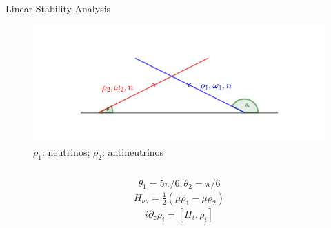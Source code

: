 \begin{frame}{Linear Stability Analysis}

   \vspace{-1em}
   \begin{figure}
      \includegraphics[width=\textwidth]{assets/two-beams-model-sym}
      \vspace{-2em}
      \caption*{$\rho_1$: neutrinos; $\rho_2$: antineutrinos}
   \end{figure}

\begin{columns}[T]
   \begin{column}{0.45\textwidth}

   \begin{equation*}
   \theta_1 =  5\pi/6, \theta_2 = \pi/6
   \end{equation*}
   \begin{align*}
      H_{\nu\nu} = \frac{1}{2}\left( \mu \rho_1 - \mu \rho_2 \right)
   \end{align*}
   \begin{equation*}
   i \partial_z \rho_i = \left[ H_i, \rho_i \right]
   \end{equation*}



\end{column}
\end{columns}
\end{frame}

